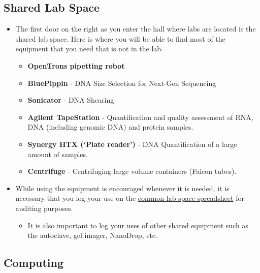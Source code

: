 \documentclass[
  letterpaper,
  DIV=11,
  numbers=noendperiod]{scrreprt}
\providecommand{\tightlist}{%
  \setlength{\itemsep}{0pt}\setlength{\parskip}{0pt}}\usepackage{longtable,booktabs,array}
\begin{document}
\hypertarget{shared-lab-space}{%
\subsection*{\texorpdfstring{\textbf{Shared Lab
Space}}{Shared Lab Space}}\label{shared-lab-space}}

\begin{itemize}
\item
  The first door on the right as you enter the hall where labs are
  located is the shared lab space. Here is where you will be able to
  find most of the equipment that you need that is not in the lab.

  \begin{itemize}
  \item
    \textbf{OpenTrons pipetting robot}
  \item
    \textbf{BluePippin} - DNA Size Selection for Next-Gen Sequencing
  \item
    \textbf{Sonicator} - DNA Shearing
  \item
    \textbf{Agilent TapeStation} - Quantification and quality assessment
    of RNA, DNA (including genomic DNA) and protein samples.
  \item
    \textbf{Synergy HTX (`Plate reader')} - DNA Quantification of a
    large amount of samples.
  \item
    \textbf{Centrifuge} - Centrifuging large volume containers (Falcon
    tubes).
  \end{itemize}
\item
  While using the equipment is encouraged whenever it is needed, it is
  necessary that you log your use on the
  \href{https://docs.google.com/spreadsheets/d/1M0RQYTqQwLS7puzn443S4CVAufBNgKyocfamQ179edU/edit\#gid=0}{common
  lab space spreadsheet} for auditing purposes.

  \begin{itemize}
  \tightlist
  \item
    It is also important to log your uses of other shared equipment such
    as the autoclave, gel imager, NanoDrop, etc.
  \end{itemize}
\end{itemize}

\hypertarget{computing}{%
\subsection*{\texorpdfstring{\textbf{Computing}}{Computing}}\label{computing}}
\end{document}
